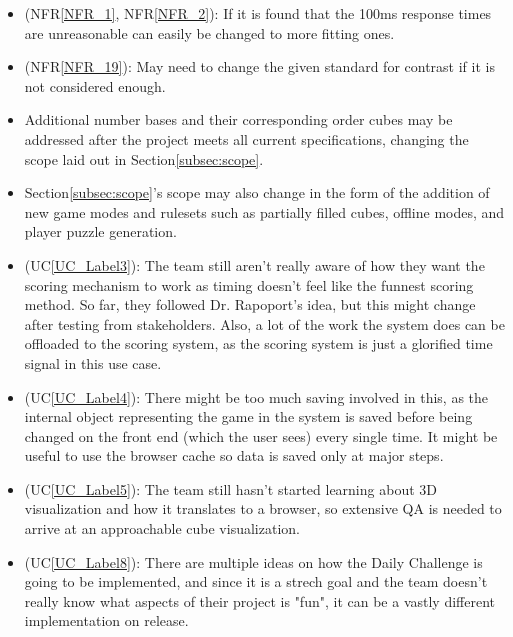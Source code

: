 \documentclass[12pt]{article}
\newcounter{lcnum} %
\begin{document}
\noindent \begin{itemize}

\item[LC\refstepcounter{lcnum}\thelcnum\label{LC_meaningfulLabel}] (NFR\ref{NFR_1}, NFR\ref{NFR_2}): If it is found that the 100ms response times are unreasonable can easily be changed to more fitting ones.
\item[LC\refstepcounter{lcnum}\thelcnum\label{LC_meaningfulLabel}] (NFR\ref{NFR_19}): May need to change the given standard for contrast if it is not considered enough.
\item[LC\refstepcounter{lcnum}\thelcnum\label{LC_meaningfulLabel}:] Additional number bases and their corresponding order cubes may be addressed after the project meets all current specifications, changing the scope laid out in Section\ref{subsec:scope}.
\item[LC\refstepcounter{lcnum}\thelcnum\label{LC_meaningfulLabel}:] Section\ref{subsec:scope}'s scope may also change in the form of the addition of new game modes and rulesets such as partially filled cubes, offline modes, and player puzzle generation.
\item[LC\refstepcounter{lcnum}\thelcnum\label{LC_meaningfulLabel}] (UC\ref{UC_Label3}): The team still aren't really aware of how they want the scoring mechanism to work as timing doesn't feel like the funnest scoring method.
So far, they followed Dr. Rapoport's idea, but this might change after testing from stakeholders. Also, a lot of the work the system does can be offloaded to the scoring system,
as the scoring system is just a glorified time signal in this use case.
\item[LC\refstepcounter{lcnum}\thelcnum\label{LC_meaningfulLabel}] (UC\ref{UC_Label4}): There might be too much saving involved in this, as the internal object representing the game in the system is saved before being changed on the front end (which the user sees)
every single time. It might be useful to use the browser cache so data is saved only at major steps.
\item[LC\refstepcounter{lcnum}\thelcnum\label{LC_meaningfulLabel}] (UC\ref{UC_Label5}): The team still hasn't started learning about 3D visualization and how it translates to a browser, so extensive QA is needed to arrive at an approachable cube visualization.
\item[LC\refstepcounter{lcnum}\thelcnum\label{LC_meaningfulLabel}] (UC\ref{UC_Label8}): There are multiple ideas on how the Daily Challenge is going to be implemented, and since it is a strech goal and the team doesn't really know what aspects of their project is "fun",
it can be a vastly different implementation on release.
\end{itemize}
\end{document}
